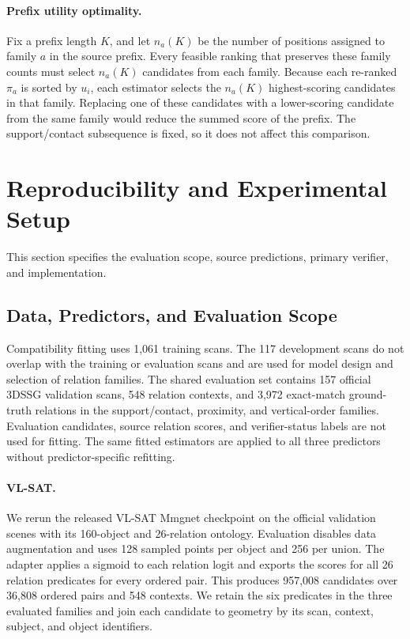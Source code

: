 \paragraph{Prefix utility optimality.}
Fix a prefix length $K$, and let $n_a(K)$ be the number of positions assigned to family $a$ in the source prefix. Every feasible ranking that preserves these family counts must select $n_a(K)$ candidates from each family. Because each re-ranked $\pi_a$ is sorted by $u_i$, each estimator selects the $n_a(K)$ highest-scoring candidates in that family. Replacing one of these candidates with a lower-scoring candidate from the same family would reduce the summed score of the prefix. The support/contact subsequence is fixed, so it does not affect this comparison.

\section{Reproducibility and Experimental Setup}

This section specifies the evaluation scope, source predictions, primary verifier, and implementation.

\subsection{Data, Predictors, and Evaluation Scope}

Compatibility fitting uses 1,061 training scans. The 117 development scans do not overlap with the training or evaluation scans and are used for model design and selection of relation families. The shared evaluation set contains 157 official 3DSSG validation scans, 548 relation contexts, and 3,972 exact-match ground-truth relations in the support/contact, proximity, and vertical-order families. Evaluation candidates, source relation scores, and verifier-status labels are not used for fitting. The same fitted estimators are applied to all three predictors without predictor-specific refitting.

\paragraph{VL-SAT.}
We rerun the released VL-SAT Mmgnet checkpoint on the official validation scenes with its 160-object and 26-relation ontology. Evaluation disables data augmentation and uses 128 sampled points per object and 256 per union. The adapter applies a sigmoid to each relation logit and exports the scores for all 26 relation predicates for every ordered pair. This produces 957,008 candidates over 36,808 ordered pairs and 548 contexts. We retain the six predicates in the three evaluated families and join each candidate to geometry by its scan, context, subject, and object identifiers.

